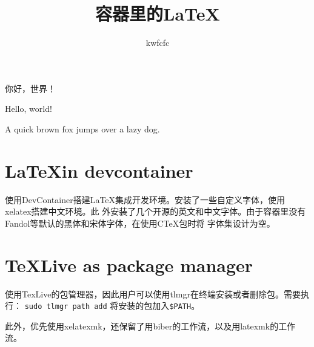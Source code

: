 \documentclass[UTF8]{article}
\author{kwfcfc}
\date{}
\title{容器里的\LaTeX }
\begin{document}
\maketitle

你好，世界！

Hello, world!

A quick brown fox jumps over a lazy dog.

\section{\LaTeX in devcontainer}

使用DevContainer搭建\LaTeX 集成开发环境。安装了一些自定义字体，使用xelatex搭建中文环境。此
外安装了几个开源的英文和中文字体。由于容器里没有Fandol等默认的黑体和宋体字体，在使用CTeX包时将
字体集设计为空。

\section{TeXLive as package manager}

使用TexLive的包管理器，因此用户可以使用tlmgr在终端安装或者删除包。需要执行：
\texttt{sudo tlmgr path add}
将安装的包加入\texttt{\$PATH}。

此外，优先使用xelatexmk，还保留了用biber的工作流，以及用latexmk的工作流。
\end{document}
